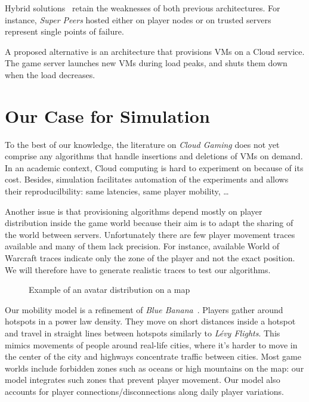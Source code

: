 \documentclass[conference]{IEEEtran}
\begin{document}
Hybrid solutions~\cite{MOPAR} retain the weaknesses of both previous architectures. For instance, \textit{Super Peers} hosted either on player nodes or on trusted servers represent single points of failure.

A proposed alternative is an architecture that provisions VMs on a Cloud service. The game server launches new VMs during load peaks, and shuts them down when the load decreases.

\section{Our Case for Simulation}

To the best of our knowledge, the literature on \textit{Cloud Gaming} does not yet comprise any algorithms that handle insertions and deletions of VMs on demand. In an academic context, Cloud computing is hard to experiment on because of its cost. Besides, simulation facilitates automation of the experiments and allows their reproducilbility: same latencies, same player mobility, \ldots

Another issue is that provisioning algorithms depend mostly on player distribution inside the game world because their aim is to adapt the sharing of the world between servers. 
Unfortunately there are few player movement traces available and many of them lack precision. For instance, available World of Warcraft traces indicate only the zone of the player and not the exact position. We will therefore  have to generate realistic traces to test our algorithms.

\begin{figure}
  \centering
  \caption{Example of an avatar distribution on a map}
  \label{fig:nuage}
\end{figure}

Our mobility model is a refinement of \textit{Blue Banana}~\cite{blue_banana}. Players gather around hotspots in a power law density. They move on short distances inside a hotspot and travel in straight lines between hotspots similarly to \textit{Lévy Flights}. This mimics movements of people around real-life cities, where it's harder to move in the center of the city and highways concentrate traffic between cities. Most game worlds include forbidden zones such as oceans or high mountains on the map: our model integrates such zones that prevent player movement. Our model also accounts for player connections/disconnections along daily player variations.
\end{document}
